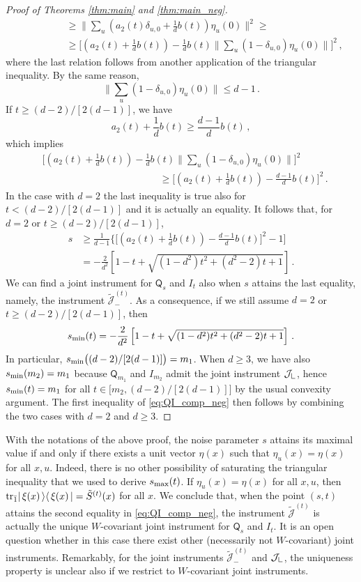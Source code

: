 \documentclass[12pt,reqno]{amsart}
\theoremstyle{definition}
\newcommand{\kb}[2]{\vert\,#1\,\rangle\langle\,#2\,\vert} %
\newcommand{\ptr}[2]{{\rm tr}_{#1} #2} %
\newcommand{\Qo}{\mathsf{Q}}%
\newcommand{\Lcorner}{{\mathchoice{\mathrel{\makebox[7pt][c]{\rule{.4pt}{7.5pt}\rule{5pt}{.4pt}}}}{\mathrel{\makebox[7pt][c]{\rule{.4pt}{7.5pt}\rule{5pt}{.4pt}}}}{\mathrel{\makebox[5.5pt][c]{\rule{.4pt}{5.25pt}\rule{3.5pt}{.4pt}}}}{\mathrel{\makebox[4pt][c]{\rule{.4pt}{3.75pt}\rule{2.5pt}{.4pt}}}}}}
\newcommand{\ii}{\mathcal{J}}
\begin{document}
\begin{proof}[Proof of Theorems \ref{thm:main} and \ref{thm:main_neg}]
\begin{align*}
& \qquad\qquad \geq \bigg\|\sum_u \left(a_2(t)\delta_{u,0} + \frac{1}{d} b(t)\right) \eta_u(0)\bigg\|^2 \geq \\
& \qquad\qquad \geq \bigg[\left(a_2(t) + \frac{1}{d} b(t)\right) - \frac{1}{d} b(t) \bigg\|\sum_u (1-\delta_{u,0}) \eta_u(0)\bigg\|\bigg]^2 \,,
\end{align*}
where the last relation follows from another application of the triangular inequality. By the same reason,
$$
\bigg\|\sum_u (1-\delta_{u,0}) \eta_u(0)\bigg\| \leq d-1 \,.
$$
If $t\geq (d-2)/[2(d-1)]$, we have
$$
a_2(t) + \frac{1}{d} b(t) \geq \frac{d-1}{d} b(t) \,,
$$
which implies
\begin{align*}
& \bigg[\left(a_2(t) + \frac{1}{d} b(t)\right) - \frac{1}{d} b(t) \bigg\|\sum_u (1-\delta_{u,0}) \eta_u(0)\bigg\|\bigg]^2  \\
& \qquad\qquad\qquad\qquad\qquad\qquad \geq \bigg[\left(a_2(t) + \frac{1}{d} b(t)\right) - \frac{d-1}{d} b(t) \bigg]^2 \,.
\end{align*}
In the case with $d=2$ the last inequality is true also for $t<(d-2)/[2(d-1)]$ and it is actually an equality. It follows that, for $d=2$ or $t\geq (d-2)/[2(d-1)]$,
\begin{align*}
s & \geq \frac{1}{d-1} \bigg\{ \bigg[\left(a_2(t) + \frac{1}{d} b(t)\right) - \frac{d-1}{d} b(t) \bigg]^2 - 1 \bigg] \\
& = - \frac{2}{d^2}\left[1 - t + \sqrt{(1 - d^2) t^2 + (d^2 - 2) t + 1}\right]\,.
\end{align*}
We can find a joint instrument for $\Qo_s$ and $I_t$ also when $s$ attains the last equality, namely, the instrument $\tilde{\ii}_-^{(t)}$. As a consequence, if we still assume $d=2$ or $t\geq (d-2)/[2(d-1)]$, then
$$
s_{\rm min}(t) = - \frac{2}{d^2}\left[1 - t + \sqrt{(1 - d^2) t^2 + (d^2 - 2) t + 1}\right] \,.
$$
In particular, $s_{\rm min}\big((d-2)/[2(d-1)]\big) = m_1$. When $d\geq 3$, we have also $s_{\rm min}(m_2) = m_1$ because $\Qo_{m_1}$ and $I_{m_2}$ admit the joint instrument $\ii_\Lcorner$, hence $s_{\rm min}(t) = m_1$ for all $t\in\big[m_2,(d-2)/[2(d-1)]\big]$ by the usual convexity argument. The first inequality of \eqref{eq:QI_comp_neg} then follows by combining the two cases with $d=2$ and $d\geq 3$. 
\end{proof}
With the notations of the above proof, the noise parameter $s$ attains its maximal value if and only if there exists a unit vector $\eta(x)$ such that $\eta_u(x) = \eta(x)$ for all $x,u$. 
Indeed, there is no other possibility of saturating the triangular inequality that we used to derive $s_{\rm max}(t)$. 
If $\eta_u(x) = \eta(x)$ for all $x,u$, then $\ptr{\bar{1}}{\kb{\xi(x)}{\xi(x)}} = \tilde{S}^{(t)}(x)$ for all $x$. 
We conclude that, when the point $(s,t)$ attains the second equality in \eqref{eq:QI_comp_neg}, the instrument $\tilde{\ii}^{(t)}$ is actually the unique $W$-covariant joint instrument for $\Qo_s$ and $I_t$. It is an open question whether in this case there exist other (necessarily not $W$-covariant) joint instruments. 
Remarkably, for the joint instruments $\tilde{\ii}^{(t)}_-$ and $\ii_\Lcorner$, the uniqueness property is unclear also if we restrict to $W$-covariant joint instruments.
\end{document}
